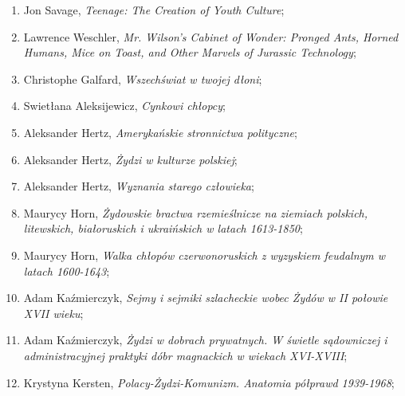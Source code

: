 \documentclass[a4paper,11pt]{article}
\begin{document}
\begin{enumerate}
\item Jon Savage, \textit{Teenage: The Creation of Youth Culture};



\item Lawrence Weschler, \textit{Mr. Wilson's Cabinet of Wonder: Pronged
    Ants, Horned Humans, Mice on Toast, and Other Marvels of Jurassic
    Technology};



\item Christophe Galfard, \textit{Wszechświat w twojej dłoni};



\item Swietłana Aleksijewicz, \textit{Cynkowi chłopcy};



\item Aleksander Hertz, \textit{Amerykańskie stronnictwa polityczne};



\item Aleksander Hertz, \textit{Żydzi w kulturze polskiej};



\item Aleksander Hertz, \textit{Wyznania starego człowieka};



\item Maurycy Horn, \textit{Żydowskie bractwa rzemieślnicze na ziemiach
    polskich, litewskich, białoruskich i ukraińskich w latach
    1613-1850};



\item Maurycy Horn, \textit{Walka chłopów czerwonoruskich z wyzyskiem
    feudalnym w latach 1600-1643};



\item Adam Kaźmierczyk, \textit{Sejmy i sejmiki szlacheckie wobec Żydów
    w II połowie XVII wieku};



\item Adam Kaźmierczyk, \textit{Żydzi w dobrach prywatnych. W świetle
    sądowniczej i administracyjnej praktyki dóbr magnackich w wiekach
    XVI-XVIII};



\item Krystyna Kersten, \textit{Polacy-Żydzi-Komunizm. Anatomia półprawd
    1939-1968};




\end{enumerate}
\end{document}
